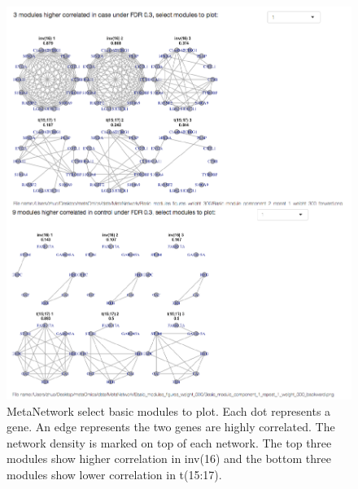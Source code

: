 \begin{figure}[H]
\begin{center}
\includegraphics[scale=0.7]{./figure/MetaNetwork/MetaNetworkBMplot.pdf}
\caption{MetaNetwork select basic modules to plot.
Each dot represents a gene.
An edge represents the two genes are highly correlated.
The network density is marked on top of each network.
The top three modules show higher correlation in inv(16) and the bottom three modules show lower correlation in t(15:17).
}
\label{fig:MetaNetworkBMplot}
\end{center}
\end{figure}

